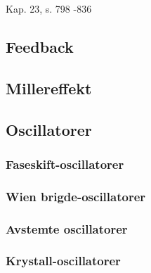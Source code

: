Kap. 23, s. 798 -836

\subsection{Feedback}
  
\subsection{Millereffekt}
  
\subsection{Oscillatorer}
  
  \subsubsection{Faseskift-oscillatorer}
    
  \subsubsection{Wien brigde-oscillatorer}
    
  \subsubsection{Avstemte oscillatorer}
    
  \subsubsection{Krystall-oscillatorer}
    
